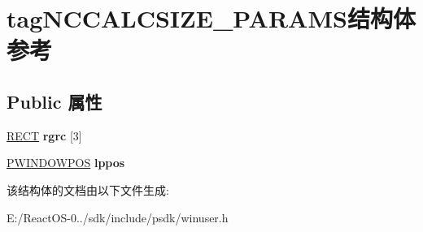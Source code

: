 \hypertarget{structtag_n_c_c_a_l_c_s_i_z_e___p_a_r_a_m_s}{}\section{tag\+N\+C\+C\+A\+L\+C\+S\+I\+Z\+E\+\_\+\+P\+A\+R\+A\+M\+S结构体 参考}
\label{structtag_n_c_c_a_l_c_s_i_z_e___p_a_r_a_m_s}
\subsection*{Public 属性}
\begin{DoxyCompactItemize}
\item 
\mbox{\label{structtag_n_c_c_a_l_c_s_i_z_e___p_a_r_a_m_s_a14c2c4212cd402dc79bec5d320658a56}} 
\hyperlink{structtag_r_e_c_t}{R\+E\+CT} {\bfseries rgrc} \mbox{[}3\mbox{]}
\item 
\mbox{\label{structtag_n_c_c_a_l_c_s_i_z_e___p_a_r_a_m_s_aaf9599cecd55a367baf9c66d7bf99232}} 
\hyperlink{struct___w_i_n_d_o_w_p_o_s}{P\+W\+I\+N\+D\+O\+W\+P\+OS} {\bfseries lppos}
\end{DoxyCompactItemize}


该结构体的文档由以下文件生成\+:\begin{DoxyCompactItemize}
\item 
E\+:/\+React\+O\+S-\/0../sdk/include/psdk/winuser.\+h\end{DoxyCompactItemize}
